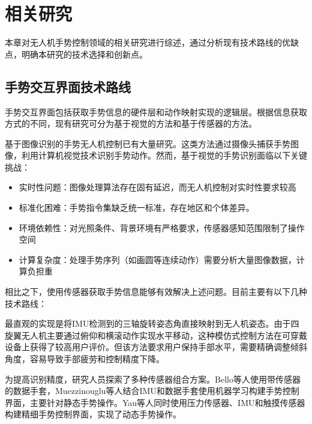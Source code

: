 \ifx\allfiles\undefined


\else
\fi

\section{相关研究}

本章对无人机手势控制领域的相关研究进行综述，通过分析现有技术路线的优缺点，明确本研究的技术选择和创新点。

\subsection{手势交互界面技术路线}

手势交互界面包括获取手势信息的硬件层和动作映射实现的逻辑层。根据信息获取方式的不同，现有研究可分为基于视觉的方法和基于传感器的方法。

基于图像识别的手势无人机控制已有大量研究\cites{patrona2021overview,nguyen2024pose,kim2020comparative}。这类方法通过摄像头捕获手势图像，利用计算机视觉技术识别手势动作。然而，基于视觉的手势识别面临以下关键挑战：
\begin{itemize}
    \item 实时性问题：图像处理算法存在固有延迟，而无人机控制对实时性要求较高
    \item 标准化困难：手势指令集缺乏统一标准，存在地区和个体差异。
    \item 环境依赖性：对光照条件、背景环境有严格要求，传感器感知范围限制了操作空间
    \item 计算复杂度：处理手势序列（如画圆等连续动作）需要分析大量图像数据，计算负担重
\end{itemize}

相比之下，使用传感器获取手势信息能够有效解决上述问题。目前主要有以下几种技术路线：

最直观的实现是将IMU检测到的三轴旋转姿态角直接映射到无人机姿态\cites{mughees2020gesture,budiyanto2021navigation,muezzinouglu2021intelligent,lee2023wearable,cherpillod2019embodied,kim2022intuitive}。由于四旋翼无人机主要通过俯仰和横滚动作实现水平移动，这种模仿式控制方法在可穿戴设备上获得了较高用户评价\cites{kim2022intuitive,lee2023wearable}。但该方法要求用户保持手部水平，需要精确调整倾斜角度，容易导致手部疲劳和控制精度下降。

为提高识别精度，研究人员探索了多种传感器组合方案。Bello等人使用带传感器的数据手套\cites{bello2023captainglove}，Muezzinouglu等人结合IMU和数据手套使用机器学习构建手势控制界面\cites{muezzinouglu2021intelligent}，主要针对静态手势操作。Yau等人\cites{yau2020subtle}同时使用压力传感器、IMU和触摸传感器构建精细手势控制界面，实现了动态手势操作。

